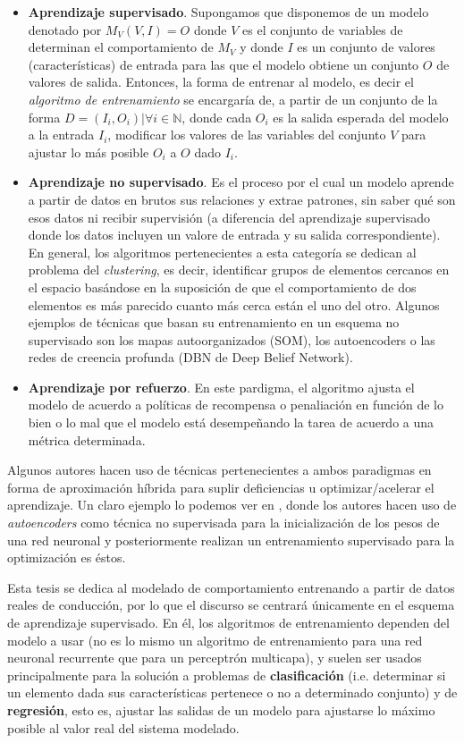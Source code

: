 \begin{itemize}
	\item \textbf{Aprendizaje supervisado}. Supongamos que disponemos de un modelo denotado por $M_V(V, I) = O$ donde $V$ es el conjunto de variables de determinan el comportamiento de $M_V$ y donde $I$ es un conjunto de valores (características) de entrada para las que el modelo obtiene un conjunto $O$ de valores de salida. Entonces, la forma de entrenar al modelo, es decir el \textit{algoritmo de entrenamiento} se encargaría de, a partir de un conjunto de la forma $D = {(I_i, O_i) | \forall i \in \mathbb{N}}$, donde cada $O_i$ es la salida esperada del modelo a la entrada $I_i$, modificar los valores de las variables del conjunto $V$ para ajustar lo más posible $O_i$ a $O$ dado $I_i$.
	\item \textbf{Aprendizaje no supervisado}. Es el proceso por el cual un modelo aprende a partir de datos en brutos sus relaciones y extrae patrones, sin saber qué son esos datos ni recibir supervisión (a diferencia del aprendizaje supervisado donde los datos incluyen un valore de entrada y su salida correspondiente). En general, los algoritmos pertenecientes a esta categoría se dedican al problema del \textit{clustering}, es decir, identificar grupos de elementos cercanos en el espacio basándose en la suposición de que el comportamiento de dos elementos es más parecido cuanto más cerca están el uno del otro. Algunos ejemplos de técnicas que basan su entrenamiento en un esquema no supervisado son los mapas autoorganizados (SOM), los autoencoders o las redes de creencia profunda (DBN de Deep Belief Network).
	\item \textbf{Aprendizaje por refuerzo}. En este pardigma, el algoritmo ajusta el modelo de acuerdo a políticas de recompensa o penaliación en función de lo bien o lo mal que el modelo está desempeñando la tarea de acuerdo a una métrica determinada. 
\end{itemize}

Algunos autores hacen uso de técnicas pertenecientes a ambos paradigmas en forma de aproximación híbrida para suplir deficiencias u optimizar/acelerar el aprendizaje. Un claro ejemplo lo podemos ver en \cite{Hinton2006}, donde los autores hacen uso de \textit{autoencoders} como técnica no supervisada para la inicialización de los pesos de una red neuronal y posteriormente realizan un entrenamiento supervisado para la optimización es éstos.

Esta tesis se dedica al modelado de comportamiento entrenando a partir de datos reales de conducción, por lo que el discurso se centrará únicamente en el esquema de aprendizaje supervisado. En él, los algoritmos de entrenamiento dependen del modelo a usar (no es lo mismo un algoritmo de entrenamiento para una red neuronal recurrente que para un perceptrón multicapa), y suelen ser usados principalmente para la solución a problemas de \textbf{clasificación} (i.e. determinar si un elemento dada sus características pertenece o no a determinado conjunto) y de \textbf{regresión}, esto es, ajustar las salidas de un modelo para ajustarse lo máximo posible al valor real del sistema modelado.

